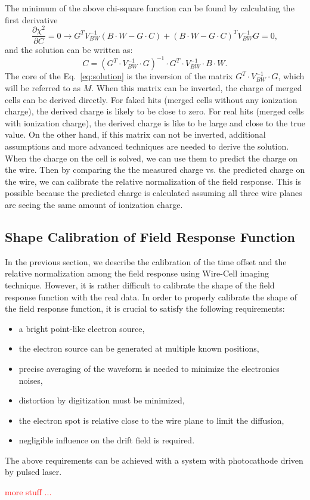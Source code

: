 The minimum of the above chi-square function can be found by calculating the 
first derivative
\begin{equation}
\frac{\partial \chi^2}{\partial C} = 0  \rightarrow
G^{T} V_{BW}^{-1} \left(B\cdot W - G\cdot C\right) +
\left(B\cdot W- G\cdot C\right)^{T} V_{BW}^{-1} G = 0,
\end{equation}
and the solution can be written as:
\begin{equation}\label{eq:solution}
C = \left( G^{T} \cdot V_{BW}^{-1} \cdot G \right)^{-1} \cdot G^{T} \cdot V_{BW}^{-1} \cdot B\cdot W.
\end{equation}
The core of the Eq.~\eqref{eq:solution} is the inversion of the matrix 
$G^{T} \cdot V_{BW}^{-1} \cdot G$, which will be referred to as $M$. 
When this matrix can be inverted, the charge
of merged cells can be derived directly. For faked hits (merged cells without 
any ionization charge), the derived charge is likely to be close to zero. For 
real hits (merged cells with ionization charge), the derived charge is like to be
large and close to the true value. On the other hand, if this matrix can not be
inverted, additional assumptions and more advanced techniques are needed to 
derive the solution. When the charge on the cell is 
solved, we can use them to predict the charge on the wire. Then by comparing the 
the measured charge vs. the predicted charge on the wire, we can calibrate the 
relative normalization of the field response. This is possible because the predicted
charge is calculated assuming all three wire planes are seeing the same amount of 
ionization charge. 


\subsection{Shape Calibration of Field Response Function}
In the previous section, we describe the calibration of the time offset and the relative normalization
among the field response using Wire-Cell imaging technique. However, it is rather difficult to 
calibrate the shape of the field response function with the real data. In order to properly 
calibrate the shape of the field response function, it is crucial to satisfy the following requirements:
\begin{itemize}
\item a bright point-like electron source,
\item the electron source can be generated at multiple known positions,
\item precise averaging of the waveform is needed to minimize the electronics noises,
\item distortion by digitization must be minimized,
\item the electron spot is relative close to the wire plane to limit the diffusion,
\item negligible influence on the drift field is required.
\end{itemize}

The above requirements can be achieved with a system with photocathode driven by pulsed laser. 

\textcolor{red}{more stuff ...}